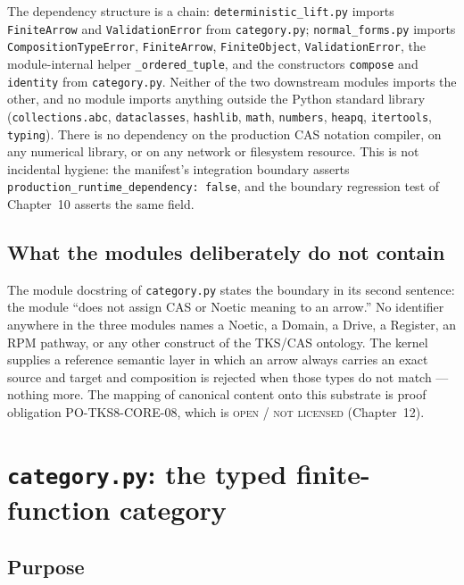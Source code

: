 The dependency structure is a chain: \texttt{deterministic\_lift.py} imports
\texttt{FiniteArrow} and \texttt{ValidationError} from \texttt{category.py};
\texttt{normal\_forms.py} imports \texttt{CompositionTypeError},
\texttt{FiniteArrow}, \texttt{FiniteObject}, \texttt{ValidationError}, the
module-internal helper \texttt{\_ordered\_tuple}, and the constructors
\texttt{compose} and \texttt{identity} from \texttt{category.py}. Neither of
the two downstream modules imports the other, and no module imports anything
outside the Python standard library (\texttt{collections.abc},
\texttt{dataclasses}, \texttt{hashlib}, \texttt{math}, \texttt{numbers},
\texttt{heapq}, \texttt{itertools}, \texttt{typing}). There is no dependency
on the production CAS notation compiler, on any numerical library, or on any
network or filesystem resource. This is not incidental hygiene: the
manifest's integration boundary asserts
\texttt{production\_runtime\_dependency: false}, and the boundary regression
test of Chapter~10 asserts the same field.

\subsection{What the modules deliberately do not contain}

\begin{boundary}\label{ch09:bdy:no-semantics}
The module docstring of \texttt{category.py} states the boundary in its
second sentence: the module ``does not assign CAS or Noetic meaning to an
arrow.'' No identifier anywhere in the three modules names a Noetic, a
Domain, a Drive, a Register, an RPM pathway, or any other construct of the
TKS/CAS ontology. The kernel supplies a reference semantic layer in which an
arrow always carries an exact source and target and composition is rejected
when those types do not match --- nothing more. The mapping of canonical
content onto this substrate is proof obligation PO-TKS8-CORE-08, which is
\textsc{open / not licensed} (Chapter~12).
\end{boundary}

\section{\texttt{category.py}: the typed finite-function category}\label{ch09:sec:category}

\subsection{Purpose}

